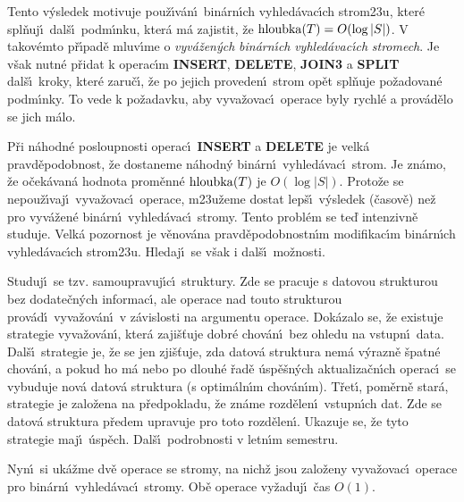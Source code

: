 \flushpar Tento v\'ysledek motivuje pou\v z\'\i v\'an\'\i\ bin\'arn\'\i ch 
vyhled\'avac\'\i ch strom\accent23u, kter\'e spl\v nuj\'\i\ dal\v s\'\i\ 
podm\'\i nku, kter\'a m\'a zajistit, \v ze 
$\operatorname{hloubka}(T)=O(\log|S|)$.  V takov\'emto p\v r\'\i pad\v e mluv\'\i me o 
\emph{vyv\'a\v zen\'ych} \emph{bin\'arn\'\i ch} 
\emph{vyhled\'avac\'\i ch} \emph{stromech}.  Je v\v sak nutn\'e 
p\v ridat k ope\-rac\'\i m {\bf INSERT}, {\bf DELETE}, {\bf JOIN3} a {\bf SPLIT} dal\v s\'\i\ 
kroky, kter\'e 
zaru\v c\'\i , \v ze po jejich proveden\'\i\ strom op\v et spl\v nuje 
po\v zadovan\'e podm\'\i nky.  To vede k po\v zadavku, aby 
vyva\v zovac\'\i\ operace byly rychl\'e a prov\'ad\v elo se jich m\'alo.  
\medskip

\flushpar P\v ri n\'ahodn\'e posloupnosti operac\'\i\ {\bf INSERT} a {\bf DELETE} je 
velk\'a pravd\v epodobnost, \v ze dostaneme n\'ahodn\'y bin\'arn\'\i\ 
vy\-hled\'avac\'\i\ strom.  Je zn\'amo, \v ze o\v cek\'avan\'a hodnota prom\v en\-n\'e 
$\operatorname{hloubka}(T)$ je $O(\log|S|)$.  Proto\v ze se nepou\v z\'\i vaj\'\i\ vyva\v zovac\'\i\ 
operace, m\accent23u\v zeme dostat lep\v s\'\i\ v\'ysledek (\v casov\v e) ne\v z pro 
vyv\'a\-\v zen\'e bin\'ar\-n\'\i\ vyhled\'avac\'\i\ stromy.  Tento probl\'em se te\v d 
intenzivn\v e studu\-je.  Velk\'a pozornost je v\v enov\'ana 
pravd\v epodobnost\-n\'\i m modifikac\'\i m bin\'arn\'\i ch vyhled\'avac\'\i ch 
strom\accent23u.  Hledaj\'\i\ se v\v sak i dal\v s\'\i\ mo\v znosti.  
\medskip

\flushpar Studuj\'\i\ se tzv.  samoupravuj\'\i c\'\i\ struktury.  Zde se 
pracuje s datovou strukturou bez dodate\v cn\'ych informac\'\i , ale 
operace nad touto strukturou prov\'ad\'\i\ vyva\v zov\'an\'\i\ v z\'avislosti 
na argumentu operace.  Dok\'azalo se, \v ze existuje strategie 
vyva\v zov\'an\'\i , kter\'a zaji\v s\v tuje dobr\'e chov\'an\'\i\ bez ohledu na 
vstupn\'\i\ data.  Dal\v s\'\i\ strategie je, \v ze se jen zji\v s\v tuje, zda datov\'a 
struktura nem\'a v\'yraz\-n\v e \v spatn\'e chov\'an\'\i , a pokud ho m\'a nebo 
po dlouh\'e \v rad\v e \'usp\v e\v s\-n\'ych aktualiza\v cn\'\i ch operac\'\i\ se vybuduje 
nov\'a datov\'a struktura (s optim\'aln\'\i m chov\'an\'\i m).  T\v ret\'\i , 
pom\v ern\v e star\'a, strategie je zalo\-\v ze\-na na p\v redpokladu, \v ze 
zn\'ame rozd\v elen\'\i\ vstupn\'\i ch dat.  Zde se datov\'a struktura 
p\v redem upravuje pro toto rozd\v elen\'\i .  Ukazuje se, \v ze tyto 
strategie maj\'\i\ \'usp\v ech.  Dal\v s\'\i\ podrobnosti v letn\'\i m semestru.  
\medskip

\flushpar Nyn\'\i\ si uk\'a\v zme dv\v e operace se stromy, na nich\v z jsou 
zalo\v zeny  vyva\v zovac\'\i\ operace pro bin\'arn\'\i\ vyhled\'avac\'\i\ 
stromy. Ob\v e ope\-race vy\v zaduj\'\i\ \v cas $O(1)$.
\medskip

